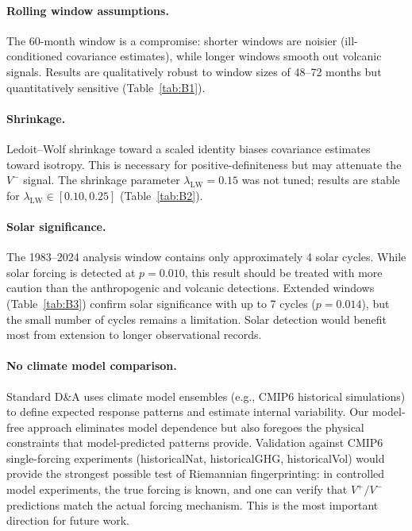 \documentclass[preprint,12pt]{elsarticle}
\newcommand{\pval}{p}
\begin{document}
\paragraph{Rolling window assumptions.}
The 60-month window is a compromise: shorter windows are noisier (ill-conditioned covariance estimates), while longer windows smooth out volcanic signals.
Results are qualitatively robust to window sizes of 48--72 months but quantitatively sensitive (Table~\ref{tab:B1}).

\paragraph{Shrinkage.}
Ledoit--Wolf shrinkage toward a scaled identity biases covariance estimates toward isotropy.
This is necessary for positive-definiteness but may attenuate the $V^-$ signal.
The shrinkage parameter $\lambda_\mathrm{LW} = 0.15$ was not tuned; results are stable for $\lambda_\mathrm{LW} \in [0.10, 0.25]$ (Table~\ref{tab:B2}).

\paragraph{Solar significance.}
The 1983--2024 analysis window contains only approximately 4 solar cycles.
While solar forcing is detected at $\pval = 0.010$, this result should be treated with more caution than the anthropogenic and volcanic detections.
Extended windows (Table~\ref{tab:B3}) confirm solar significance with up to 7 cycles ($\pval = 0.014$), but the small number of cycles remains a limitation.
Solar detection would benefit most from extension to longer observational records.

\paragraph{No climate model comparison.}
Standard D\&A uses climate model ensembles (e.g., CMIP6 historical simulations) to define expected response patterns and estimate internal variability.
Our model-free approach eliminates model dependence but also foregoes the physical constraints that model-predicted patterns provide.
Validation against CMIP6 single-forcing experiments (historicalNat, historicalGHG, historicalVol) would provide the strongest possible test of Riemannian fingerprinting: in controlled model experiments, the true forcing is known, and one can verify that $V^+/V^-$ predictions match the actual forcing mechanism.
This is the most important direction for future work.
\end{document}
